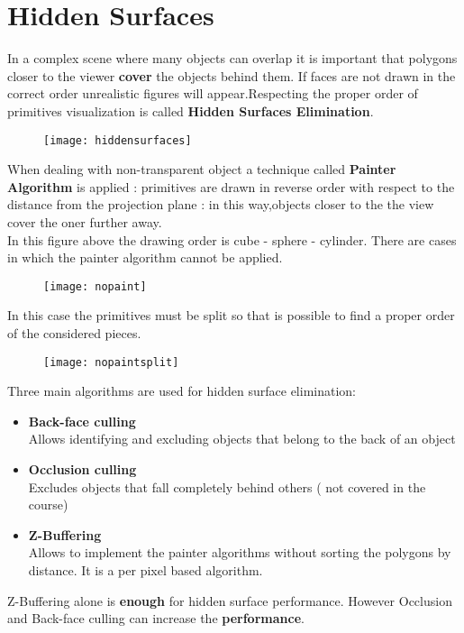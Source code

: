 \newpage
\section{Hidden Surfaces}
In a complex scene where many objects can overlap it is important that polygons closer to the viewer \textbf{cover} the objects behind them. If faces are not drawn in the correct order unrealistic figures will appear.Respecting the proper order of primitives visualization is called \textbf{Hidden Surfaces Elimination}.\\
\begin{figure}[H]
  \centering
  \texttt{[image: hiddensurfaces]}
\end{figure}
When dealing with non-transparent object a technique called \textbf{Painter Algorithm} is applied : primitives are drawn in reverse order with respect to the distance from the projection plane : in this way,objects closer to the the view cover the oner further away.\\
In this figure above the drawing order is cube - sphere - cylinder.
There are cases in which the painter algorithm cannot be applied.
\begin{figure}[H]
  \centering
  \texttt{[image: nopaint]}
\end{figure}
In this case the primitives must be split so that is possible to find	a proper order of the considered pieces.
\begin{figure}[H]
  \centering
  \texttt{[image: nopaintsplit]}
\end{figure}
Three main algorithms are used for hidden surface elimination:
\begin{itemize}
\item \textbf{Back-face culling}\\
Allows identifying and excluding objects that belong to the back of an object
\item \textbf{Occlusion culling}\\
Excludes objects that fall completely behind others ( not covered in the course)
\item \textbf{Z-Buffering}\\
Allows to implement the painter algorithms without sorting the polygons by distance.
It is a per pixel based algorithm.
\end{itemize}
Z-Buffering alone is \textbf{enough} for hidden surface performance. However Occlusion and Back-face culling can increase the \textbf{performance}.

